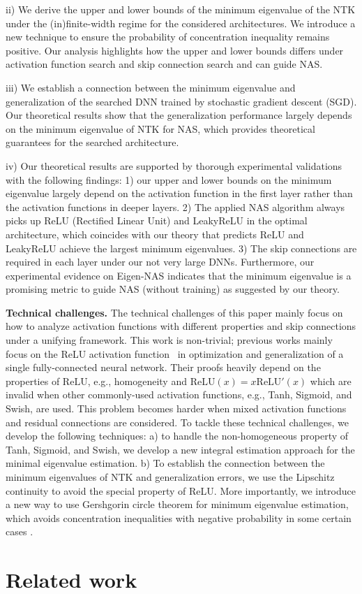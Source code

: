 \documentclass[nohyperref]{article}
\theoremstyle{plain}
\theoremstyle{definition}
\theoremstyle{remark}
\begin{document}
ii) We derive the upper and lower bounds of the minimum eigenvalue of the NTK under the (in)finite-width regime for the considered architectures. We introduce a new technique to ensure the probability of concentration inequality remains positive. Our analysis highlights how the upper and lower bounds differs under activation function search and skip connection search and can guide NAS. 

iii) We establish a connection between the minimum eigenvalue and generalization of the searched DNN trained by stochastic gradient descent (SGD). Our theoretical results show that the generalization performance largely depends on the minimum eigenvalue of NTK for NAS, which provides theoretical guarantees for the searched architecture.




iv) Our theoretical results are supported by thorough experimental validations with the following findings: 1) our upper and lower bounds on the minimum eigenvalue largely depend on the activation function in the first layer rather than the activation functions in deeper layers. 2) The applied NAS algorithm always picks up ReLU (Rectified Linear Unit) and LeakyReLU in the optimal architecture, which coincides with our theory that predicts ReLU and LeakyReLU achieve the largest minimum eigenvalues. 3) The skip connections are required in each layer under our not very large DNNs. Furthermore, our experimental evidence on Eigen-NAS indicates that the minimum eigenvalue is a promising metric to guide NAS (without training) as suggested by our theory. 




{\bf Technical challenges.} 
The technical challenges of this paper mainly focus on how to analyze activation functions with different properties and skip connections under a unifying framework. This work is non-trivial; previous works mainly focus on the ReLU activation function~\citep{pmlr-v139-nguyen21g, cao2019generalization, pmlr-v97-allen-zhu19a} in optimization and generalization of a single fully-connected neural network. Their proofs heavily depend on the properties of $\mathrm{ReLU}$, e.g., homogeneity and $\mathrm{ReLU}(x) = x\mathrm{ReLU}'(x)$ which are invalid when other commonly-used activation functions, e.g., Tanh, Sigmoid, and Swish, are used. 
This problem becomes harder when mixed activation functions and residual connections are considered.
To tackle these technical challenges, we develop the following techniques: a) to handle the non-homogeneous property of Tanh, Sigmoid, and Swish, we develop a new integral estimation approach for the minimal eigenvalue estimation. b) To establish the connection between the minimum eigenvalues of NTK and generalization errors, we use the Lipschitz continuity to avoid the special property of ReLU.
More importantly, we introduce a new way to use Gershgorin circle theorem for minimum eigenvalue estimation, which avoids concentration inequalities with negative probability in some certain cases \citep{pmlr-v139-nguyen21g}. \section{Related work}
\label{sec:related_work}
\end{document}
